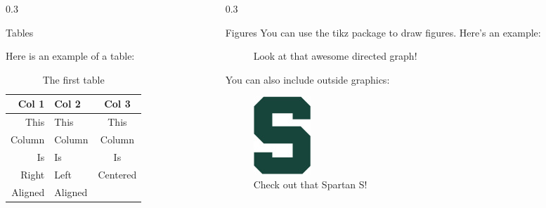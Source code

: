 \documentclass{msuposter}
\newcommand{\colwidth}{0.3\linewidth}
\begin{document}
\begin{frame}{}
\begin{columns}[t]
\begin{column}{\colwidth}
\begin{block}{Tables}

Here is an example of a table:
\begin{table}\centering
\caption[Table short caption]{The first table}
\begin{tabular}{r|l c}
  Col 1   & Col 2  & Col 3 \\\hline
  This    & This   & This \\
  Column  & Column & Column \\
  Is      & Is     & Is \\
  Right   & Left   & Centered \\
  Aligned & Aligned
\end{tabular}
\end{table}

\end{block}

\end{column}


\begin{column}{\colwidth}

\begin{block}{Figures}
You can use the {\ttfamily tikz} package to draw figures.  Here's an example:
\begin{figure}\centering
{}
\caption[Figure short caption]{Look at that awesome directed graph!}\label{fig:coolgraph}
\end{figure}

You can also include outside graphics:
\begin{figure}\centering
  \includegraphics[scale=1]{spartans.jpg} %
  \caption{Check out that Spartan S!}\label{fig:flyingC}
\end{figure}


\end{block}
\end{column}
\end{columns}
\end{frame}
\end{document}
